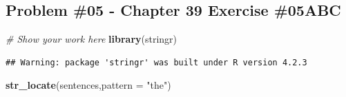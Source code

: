\documentclass[
]{article}
\newenvironment{Shaded}{\begin{snugshade}}{\end{snugshade}}
\newcommand{\AttributeTok}[1]{\textcolor[rgb]{0.13,0.29,0.53}{#1}}
\newcommand{\CommentTok}[1]{\textcolor[rgb]{0.56,0.35,0.01}{\textit{#1}}}
\newcommand{\FunctionTok}[1]{\textcolor[rgb]{0.13,0.29,0.53}{\textbf{#1}}}
\newcommand{\NormalTok}[1]{#1}
\newcommand{\StringTok}[1]{\textcolor[rgb]{0.31,0.60,0.02}{#1}}
\begin{document}
\newpage

\hypertarget{problem-05---chapter-39-exercise-05abc}{%
\subsection{Problem \#05 - Chapter 39 Exercise
\#05ABC}\label{problem-05---chapter-39-exercise-05abc}}

\begin{Shaded}
\begin{Highlighting}[]
\CommentTok{\# Show your work here}
\FunctionTok{library}\NormalTok{(stringr)}
\end{Highlighting}
\end{Shaded}

\begin{verbatim}
## Warning: package 'stringr' was built under R version 4.2.3
\end{verbatim}

\begin{Shaded}
\begin{Highlighting}[]
\FunctionTok{str\_locate}\NormalTok{(sentences,}\AttributeTok{pattern =} \StringTok{"the"}\NormalTok{)}
\end{Highlighting}
\end{Shaded}
\end{document}
